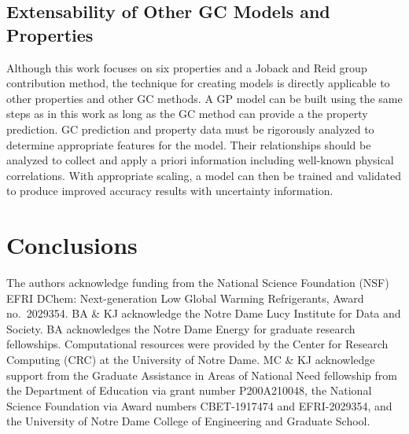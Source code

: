 \documentclass[journal=jacsat,manuscript=article]{achemso}
\begin{document}
\subsection{Extensability of Other GC Models and Properties}
Although this work focuses on six properties and a Joback and Reid group contribution method, the technique for creating models is directly applicable to other properties and other GC methods. A GP model can be built using the same steps as in this work as long as the GC method can provide a the property prediction. GC prediction and property data must be rigorously analyzed to determine appropriate features for the model. Their relationships should be analyzed to collect and apply a priori information including well-known physical correlations. With appropriate scaling, a model can then be trained and validated to produce improved accuracy results with uncertainty information.

\section{Conclusions}



\begin{acknowledgement}
The authors acknowledge funding from the National Science Foundation (NSF) EFRI DChem: Next-generation Low Global Warming Refrigerants, Award no.~2029354. BA \& KJ acknowledge the Notre Dame Lucy Institute for Data and Society. BA acknowledges the Notre Dame Energy for graduate research fellowships. Computational resources were provided by the Center for Research Computing (CRC) at the University of Notre Dame. MC \& KJ acknowledge support from the Graduate Assistance in Areas of National Need fellowship from the Department of Education via grant number P200A210048, the National Science Foundation via Award numbers CBET-1917474 and EFRI-2029354, and the University of Notre Dame College of Engineering and Graduate School.  
\end{acknowledgement}
\end{document}
